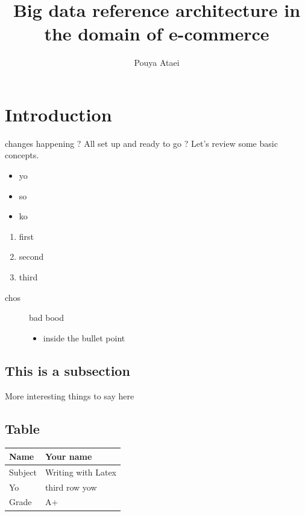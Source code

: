 \documentclass{article}
\title{ Big data reference architecture in the domain of e-commerce }
\author{ Pouya Ataei }
\begin{document}
\maketitle



\section{Introduction}

changes happening ?
All set up and ready to go ? Let's review some basic concepts.

\begin{itemize}
	\item {yo}
	\item {so}
	\item  {ko}
\end{itemize}

\begin{enumerate}
	\item {first}
	\item {second}
	\item {third}
\end{enumerate}

\begin{description}
	\item[chos] bad bood
	      \begin{itemize}
		      \item inside the bullet point
	      \end{itemize}
\end{description}

\subsection{This is a subsection}

More interesting things to say here

\subsection{Table}
\vspace{5mm}
\begin{tabular}{|l|l|}
	\hline
	Name    & Your name          \\
	\hline
	Subject & Writing with Latex \\
	\hline
	Yo      & third row yow      \\
	\hline
	Grade   & A+                 \\
	\hline
\end{tabular}
\end{document}
